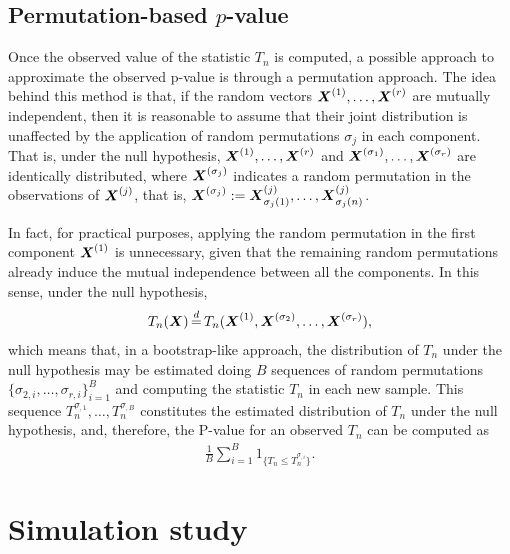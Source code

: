 \documentclass[oneside,11pt]{article}
\begin{document}
\subsection{Permutation-based $p$-value}\label{sec-permutation}

Once the observed value of the statistic $T_n$ is computed, a possible approach to approximate the observed p-value is through a permutation approach. The idea behind this method is that, if the random vectors $\boldsymbol{X}^{(1)}, \dots, \boldsymbol{X}^{(r)}$ are mutually independent, then it is reasonable to assume that their joint distribution is unaffected by the application of random permutations $\sigma_j$ in each component. That is, under the null hypothesis, $\boldsymbol{X}^{(1)}, \dots, \boldsymbol{X}^{(r)}$ and $\boldsymbol{X}^{(\sigma_1)}, \dots, \boldsymbol{X}^{(\sigma_r)}$ are identically distributed, where $\boldsymbol{X}^{(\sigma_j)}$ indicates a random permutation in the observations of $\boldsymbol{X}^{(j)}$, that is, $\boldsymbol{X}^{(\sigma_j)} := \boldsymbol{X}_{\sigma_j(1)}^{(j)}, \dots, \boldsymbol{X}_{\sigma_j(n)}^{(j)}$.

In fact, for practical purposes, applying the random permutation in the first component $\boldsymbol{X}^{(1)}$ is unnecessary, given that the remaining random permutations already induce the mutual independence between all the components. In this sense, under the null hypothesis,
\begin{align*}
    T_n(\bX) \,{\buildrel d \over =}\, T_n(\bX^{(1)}, \bX^{(\sigma_2)}, \dots, \bX^{(\sigma_r)}),
\end{align*}
which means that, in a bootstrap-like approach, the distribution of $T_n$ under the null hypothesis may be estimated doing $B$ sequences of random permutations $ \{ \sigma_{2,i}, \dots, \sigma_{r,i} \}_{i=1}^{B} $ and computing the statistic $T_n$ in each new sample. This sequence $T_n^{\sigma_{,1}}, \dots, T_n^{\sigma_{,B}}$ constitutes the estimated distribution of $T_n$ under the null hypothesis, and, therefore, the P-value for an observed $T_n$ can be computed as
\begin{align*}
    \frac{1}{B} \sum_{i=1}^{B} 1_{\{T_n \le T_n^{\sigma_{,i}}\}}.
\end{align*}

\section{Simulation study}
\label{sec:simulation}

\end{document}
